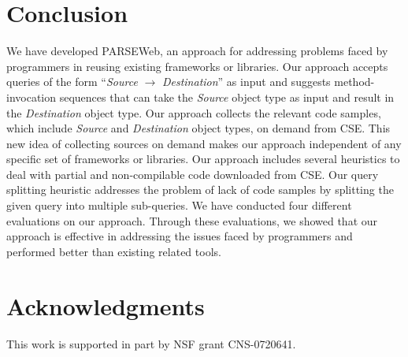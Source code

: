 \documentclass{fp035-thummalapenta}
\begin{document}
\section{Conclusion}
\label{sec:conclusion}

We have developed PARSEWeb, an approach for addressing problems
faced by programmers in reusing existing frameworks or libraries.
Our approach accepts queries of the form ``\emph{Source}
$\rightarrow$ \emph{Destination}'' as input and suggests
method-invocation sequences that can take the \emph{Source} object
type as input and result in the \emph{Destination} object type. Our
approach collects the relevant code samples, which include
\emph{Source} and \emph{Destination} object types, on demand from CSE.
This new idea of collecting sources on demand makes our approach 
independent of any specific set of
frameworks or libraries. Our approach includes several heuristics to
deal with partial and non-compilable code downloaded from CSE. Our 
query splitting heuristic addresses the problem of lack of
code samples by splitting the given query into multiple sub-queries.
We have conducted four different evaluations on our
approach. Through these evaluations, we showed that our approach is effective
in addressing the issues faced by programmers and performed
better than existing related tools.

\section*{Acknowledgments}

This work is supported in part by NSF grant CNS-0720641.
\end{document}
